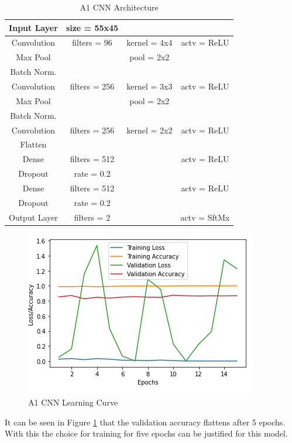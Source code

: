\documentclass{article}
\begin{document}
 	\begin{table}[]
 		\begin{tabular}{|c|c c c|}
 			\hline
 			Input Layer & size = 55x45 	&				&	\\
 			\hline
 			Convolution & filters = 96 	& kernel = 4x4 	& actv = ReLU\\
 			\hline
 			Max Pool	&				& pool = 2x2  	& \\
 			\hline
 			Batch Norm. & 				&				&\\
 			\hline
 			Convolution & filters = 256 & kernel = 3x3 	& actv = ReLU\\
 			\hline
 			Max Pool	&				& pool = 2x2	&\\
 			\hline
 			Batch Norm. &				&				&\\
 			\hline
 			Convolution & filters = 256 & kernel = 2x2	& actv = ReLU\\
 			\hline
 			Flatten 	& 				& 				&\\
 			\hline
 			Dense 		& filters = 512 &				& actv = ReLU\\
 			\hline
 			Dropout 	&	rate = 0.2 	&	 			&\\
 			\hline
 			Dense 		& filters = 512 &				& actv = ReLU\\
 			\hline
 			Dropout 	& rate = 0.2 	& 				&\\
 			\hline
 			Output Layer& filters = 2 	&				& actv = SftMx\\
 			\hline
 		\end{tabular}
 	\caption{A1 CNN Architecture}
 	\label{table:A1_Arch}
 	\end{table} 
    \begin{figure}[htb]
		\centering
		\includegraphics[scale=0.7]{Figures/A1_CNN_Graph.PNG}
		\caption{A1 CNN Learning Curve}
		\label{fig:A1_curve}
	\end{figure}
	It can be seen in Figure \ref{fig:A1_curve} that the validation accuracy flattens after 5 epochs. With this the choice for training for five epochs can be justified for this model. 	
\end{document}
